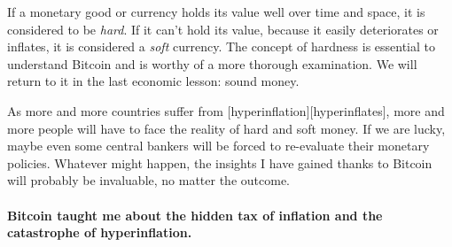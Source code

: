 If a monetary good or currency holds its value well over time and space,
it is considered to be \textit{hard}. If it can't hold its value, because it
easily deteriorates or inflates, it is considered a \textit{soft} currency. The
concept of hardness is essential to understand Bitcoin and is worthy of
a more thorough examination. We will return to it in the last economic
lesson: sound money.

As more and more countries suffer from [hyperinflation][hyperinflates],
more and more people will have to face the reality of hard and soft
money. If we are lucky, maybe even some central bankers will be forced
to re-evaluate their monetary policies. Whatever might happen, the
insights I have gained thanks to Bitcoin will probably be invaluable, no
matter the outcome.

\paragraph{Bitcoin taught me about the hidden tax of inflation and the catastrophe
of hyperinflation.}

%
%
%
%
%
